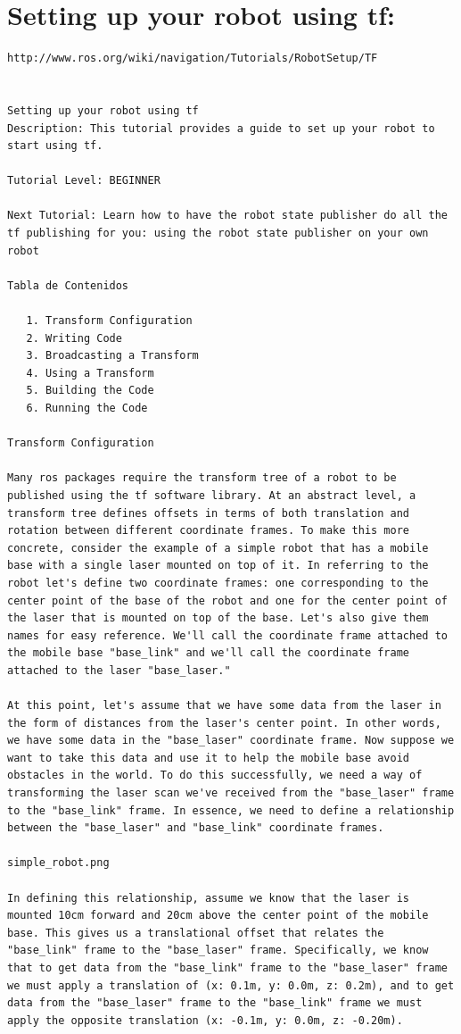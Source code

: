 \chapter*{Setting up your robot using tf:}

\begin{verbatim}
http://www.ros.org/wiki/navigation/Tutorials/RobotSetup/TF


Setting up your robot using tf
Description: This tutorial provides a guide to set up your robot to start using tf.

Tutorial Level: BEGINNER

Next Tutorial: Learn how to have the robot state publisher do all the tf publishing for you: using the robot state publisher on your own robot

Tabla de Contenidos

   1. Transform Configuration
   2. Writing Code
   3. Broadcasting a Transform
   4. Using a Transform
   5. Building the Code
   6. Running the Code

Transform Configuration

Many ros packages require the transform tree of a robot to be published using the tf software library. At an abstract level, a transform tree defines offsets in terms of both translation and rotation between different coordinate frames. To make this more concrete, consider the example of a simple robot that has a mobile base with a single laser mounted on top of it. In referring to the robot let's define two coordinate frames: one corresponding to the center point of the base of the robot and one for the center point of the laser that is mounted on top of the base. Let's also give them names for easy reference. We'll call the coordinate frame attached to the mobile base "base_link" and we'll call the coordinate frame attached to the laser "base_laser."

At this point, let's assume that we have some data from the laser in the form of distances from the laser's center point. In other words, we have some data in the "base_laser" coordinate frame. Now suppose we want to take this data and use it to help the mobile base avoid obstacles in the world. To do this successfully, we need a way of transforming the laser scan we've received from the "base_laser" frame to the "base_link" frame. In essence, we need to define a relationship between the "base_laser" and "base_link" coordinate frames.

simple_robot.png

In defining this relationship, assume we know that the laser is mounted 10cm forward and 20cm above the center point of the mobile base. This gives us a translational offset that relates the "base_link" frame to the "base_laser" frame. Specifically, we know that to get data from the "base_link" frame to the "base_laser" frame we must apply a translation of (x: 0.1m, y: 0.0m, z: 0.2m), and to get data from the "base_laser" frame to the "base_link" frame we must apply the opposite translation (x: -0.1m, y: 0.0m, z: -0.20m).


\end{verbatim}
